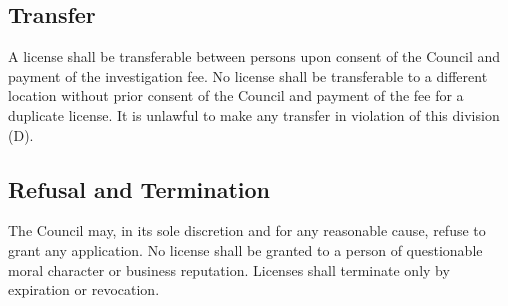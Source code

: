 \subsection{Transfer}
A license shall be transferable between persons upon consent of the Council and payment of the investigation fee.  No license shall be transferable to a different location without prior consent of the Council and payment of the fee for a duplicate license.  It is unlawful to make any transfer in violation of this division (D).
\subsection{Refusal and Termination}
The Council may, in its sole discretion and for any reasonable cause, refuse to grant any application.  No license shall be granted to a person of questionable moral character or business reputation.  Licenses shall terminate only by expiration or revocation.
